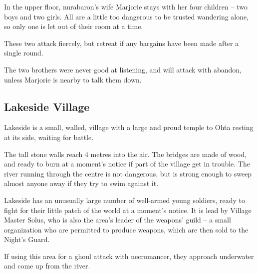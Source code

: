 \begin{multicols}{2}

In the upper floor, \gls{nurabaron}'s wife Marjorie stays with her four children -- two boys and two girls.  All are a little too dangerous to be trusted wandering alone, so only one is let out of their room at a time.


These two attack fiercely, but retreat if any bargains have been made after a single round.


The two brothers were never good at listening, and will attack with abandon, unless Marjorie is nearby to talk them down.

\subsection{Lakeside Village}

\begin{figure*}[t]



\label{lakeside}

\end{figure*}

Lakeside is a small, walled, village with a large and proud temple to Ohta resting at its side, waiting for battle.

The tall stone walls reach 4 metres into the air.
The bridges are made of wood, and ready to burn at a moment's notice if part of the village get in trouble.
The river running through the centre is not dangerous, but is strong enough to sweep almost anyone away if they try to swim against it.

Lakeside has an unusually large number of well-armed young soldiers, ready to fight for their little patch of the world at a moment's notice.
It is lead by Village Master Solus, who is also the area's leader of the weapons' guild -- a small organization who are permitted to produce weapons, which are then sold to the Night's Guard.

\label{solus}

If using this area for a ghoul attack with \gls{necromancer}, they approach underwater and come up from the river.


\end{multicols}

